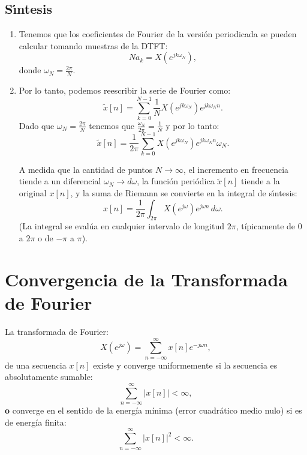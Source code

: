 \subsection{S\'{\i}ntesis}

\begin{enumerate}
	\item Tenemos que los coeficientes de Fourier de la versión periodicada se pueden calcular tomando muestras de la DTFT:
	\begin{equation}
		N a_{k} = X(e^{jk\omega_{N}}),
	\end{equation}
	donde $\omega_{N} = \frac{2\pi}{N}$.
	
	\item Por lo tanto, podemos reescribir la serie de Fourier como:
	\begin{equation}
		\tilde{x}[n] = \sum_{k=0}^{N-1} \frac{1}{N} X(e^{jk\omega_{N}}) e^{jk\omega_{N}n}.
	\end{equation}
	Dado que $\omega_{N} = \frac{2\pi}{N}$ tenemos que $\frac{\omega_{N}}{2\pi} = \frac{1}{N}$ y por lo tanto:
	\begin{equation}
		\tilde{x}[n] = \frac{1}{2\pi} \sum_{k=0}^{N-1} X(e^{jk\omega_{N}}) e^{jk\omega_{N}n} \omega_{N}.
	\end{equation}
	
	A medida que la cantidad de puntos $N \to \infty$, el incremento en frecuencia tiende a un diferencial $\omega_{N} \to d\omega$, la funci\'{o}n peri\'{o}dica $\tilde{x}[n]$ tiende a la original $x[n]$, y la suma de Riemann se convierte en la integral de s\'{\i}ntesis:
	\begin{equation}
		x[n] = \frac{1}{2\pi} \int_{2\pi} X(e^{j\omega}) e^{j\omega n} \, d\omega.
	\end{equation}
	(La integral se evalúa en cualquier intervalo de longitud $2\pi$, típicamente de $0$ a $2\pi$ o de $-\pi$ a $\pi$).
\end{enumerate}

\section{Convergencia de la Transformada de Fourier}

La transformada de Fourier:
\begin{equation}
	X(e^{j\omega}) = \sum_{n=-\infty}^{\infty} x[n] e^{-j\omega n},
\end{equation}
de una secuencia $x[n]$ existe y converge uniformemente si la secuencia es absolutamente sumable:
\begin{equation}
	\sum_{n=-\infty}^{\infty} |x[n]| < \infty,
\end{equation}
\textbf{o} converge en el sentido de la energía mínima (error cuadrático medio nulo) si es de energía finita:
\begin{equation}
	\sum_{n=-\infty}^{\infty} |x[n]|^{2} < \infty.
\end{equation}

